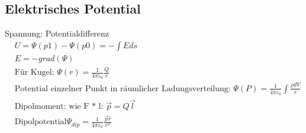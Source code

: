 \subsection*{Elektrisches Potential}
Spannung: Potentialdifferenz
\begin{align*}
    & U = \Psi(p1) - \Psi(p0) = -\int E ds\\
    & E = -grad(\Psi)\\
    & \text{Für Kugel: } \Psi(r) = \frac{1}{4 \pi \varepsilon_0} \frac{Q}{r}\\
    & \text{Potential einzelner Punkt in räumlicher Ladungsverteilung: } \Psi(P) = \frac{1}{4 \pi \varepsilon_0} \int \frac{\rho dV}{r}\\
    & \text{Dipolmoment: wie F * l: } \overrightarrow{p} = Q \overrightarrow{l}\\
    & \text{Dipolpotential} \Psi_{dip} = \frac{1}{4 \pi \varepsilon_0} \frac{\overrightarrow{p} \hat{r}}{r^2}\\
\end{align*}